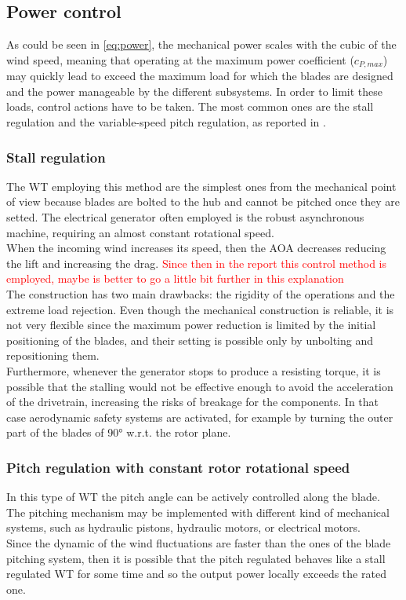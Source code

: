 \subsection{Power control}
As could be seen in \autoref{eq:power}, the mechanical power scales with the cubic of the wind speed, meaning that operating at the maximum power coefficient ($c_{P, max}$) may quickly lead to exceed the maximum load for which the blades are designed and the power manageable by the different subsystems. In order to limit these loads, control actions have to be taken. The most common ones are the stall regulation and the variable-speed pitch regulation, as reported in \cite{Aerodynamics_of_wind_turbines}.
\subsubsection{Stall regulation}\label{subsec:stall_regulation_theory}
The \acrshort{WT} employing this method are the simplest ones from the mechanical point of view because blades are bolted to the hub and cannot be pitched once they are setted. The electrical generator often employed is the robust asynchronous machine, requiring an almost constant rotational speed.\\
When the incoming wind increases its speed, then the \acrshort{AOA} decreases reducing the lift and increasing the drag. \textcolor{red}{Since then in the report this control method is employed, maybe is better to go a little bit further in this explanation}\\
The construction has two main drawbacks: the rigidity of the operations and the extreme load rejection. Even though the mechanical construction is reliable, it is not very flexible since the maximum power reduction is limited by the initial positioning of the blades, and their setting is possible only by unbolting and repositioning them.\\
Furthermore, whenever the generator stops to produce a resisting torque, it is possible that the stalling would not be effective enough to avoid the acceleration of the drivetrain, increasing the risks of breakage for the components. In that case aerodynamic safety systems are activated, for example by turning the outer part of the blades of 90$\si{\degree}$ w.r.t. the rotor plane. 

\subsubsection{Pitch regulation with constant rotor rotational speed}
In this type of \acrshort{WT} the pitch angle can be actively controlled along the blade. The pitching mechanism may be implemented with different kind of mechanical systems, such as hydraulic pistons, hydraulic motors, or electrical motors. \\
Since the dynamic of the wind fluctuations are faster than the ones of the blade pitching system, then it is possible that the pitch regulated behaves like a stall regulated \acrshort{WT} for some time and so the output power locally exceeds the rated one.

